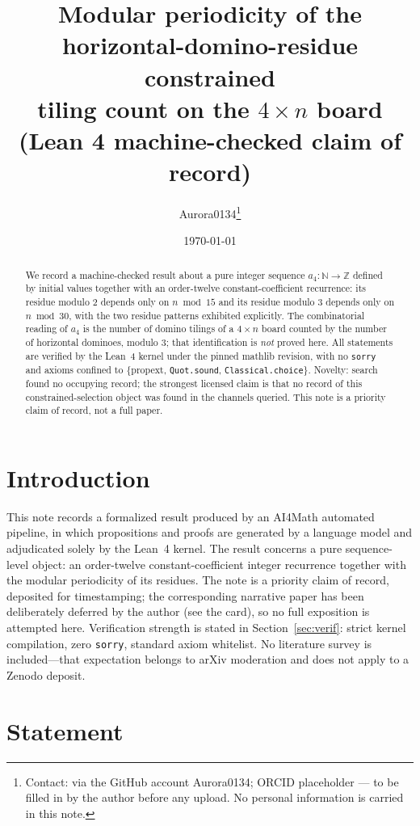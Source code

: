 \documentclass[11pt]{article}
\title{Modular periodicity of the horizontal-domino-residue constrained\\
tiling count on the $4\times n$ board\\
{\large (Lean 4 machine-checked claim of record)}}
\author{Aurora0134\thanks{Contact: via the GitHub account Aurora0134; ORCID
placeholder --- to be filled in by the author before any upload. No personal
information is carried in this note.}}
\date{\today}
\begin{document}
\maketitle

\begin{abstract}
We record a machine-checked result about a pure integer sequence
$a_4\colon\mathbb{N}\to\mathbb{Z}$ defined by initial values together with an
order-twelve constant-coefficient recurrence: its residue modulo $2$ depends only
on $n \bmod 15$ and its residue modulo $3$ depends only on $n \bmod 30$, with the
two residue patterns exhibited explicitly. The combinatorial reading of $a_4$ is
the number of domino tilings of a $4\times n$ board counted by the number of
horizontal dominoes, modulo 3; that identification is \emph{not} proved here. All
statements are verified by the Lean~4 kernel under the pinned mathlib revision,
with no \texttt{sorry} and axioms confined to \{propext, \texttt{Quot.sound},
\texttt{Classical.choice}\}. Novelty: search found no occupying record; the
strongest licensed claim is that no record of this constrained-selection object
was found in the channels queried. This note is a priority claim of record, not a
full paper.
\end{abstract}

\section{Introduction}
This note records a formalized result produced by an AI4Math automated pipeline, in which
propositions and proofs are generated by a language model and adjudicated solely by the
Lean~4 kernel. The result concerns a pure sequence-level object: an order-twelve
constant-coefficient integer recurrence together with the modular periodicity of its
residues. The note is a priority claim of record, deposited for timestamping; the
corresponding narrative paper has been deliberately deferred by the author (see the card),
so no full exposition is attempted here. Verification strength is stated in
Section~\ref{sec:verif}: strict kernel compilation, zero \texttt{sorry}, standard axiom
whitelist. No literature survey is included---that expectation belongs to arXiv moderation
and does not apply to a Zenodo deposit.

\section{Statement}
\end{document}
